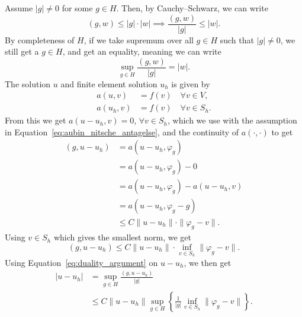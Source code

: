 \begin{bev}
    Assume $|g|\neq 0$ for some $g\in H$. Then,
    by Cauchy–Schwarz, we can write 
    \begin{equation*}
        (g,w) \leq |g| \cdot |w| \implies \frac{(g,w)}{|g|} \leq |w|.
    \end{equation*}
    By completeness of $H$, if we take supremum over all $g\in H$ such that 
    $|g|\neq 0$, we still get a $g\in H$, and get 
    an equality, meaning we can write
    \begin{equation}
        \sup_{g\in H} \frac{(g,w)}{|g|} = |w|. \label{eq:duality_argument}
    \end{equation}
    The solution $u$ and finite element solution $u_h$ is given by 
    \begin{align*}
        a(u,v) &= f(v) \quad \forall v \in V, \\
        a(u_h,v) &= f(v) \quad \forall v \in S_h.
    \end{align*}
    From this we get $a(u-u_h,v)=0$, $\forall v\in S_h$, which we use with the assumption in 
    Equation~\ref{eq:aubin_nitsche_antagelse}, and the continuity of $a(\cdot,\cdot)$ to get
    \begin{align*}
        (g,u-u_h) &= a(u-u_h,\varphi _g) \\
                  &= a(u-u_h,\varphi _g) -0 \\
                  &=a(u-u_h,\varphi _g) -a(u-u_h,v) \\
                  &=a(u-u_h, \varphi_g -g) \\
                  &\leq C \|u-u_h\| \cdot \|\varphi_g-v\|.
    \end{align*}
    Using $v\in S_h$ which gives the smallest norm, we get 
    \begin{equation*}
        (g,u-u_h) \leq C \|u-u_h\| \cdot \inf_{v\in S_h} \|\varphi_g-v\|.
    \end{equation*}
    Using Equation~\ref{eq:duality_argument} on $u-u_h$, we then get 
    \begin{align*}
        |u-u_h| &= \sup_{g\in H} \frac{(g,u-u_h)}{|g|} \\
        &\leq C \| u-u_h\| \sup_{g\in H} \left \{ \frac{1}{|g|} \inf_{v \in S_h} \|\varphi_g - v\| \right \}.
    \end{align*}
\end{bev}